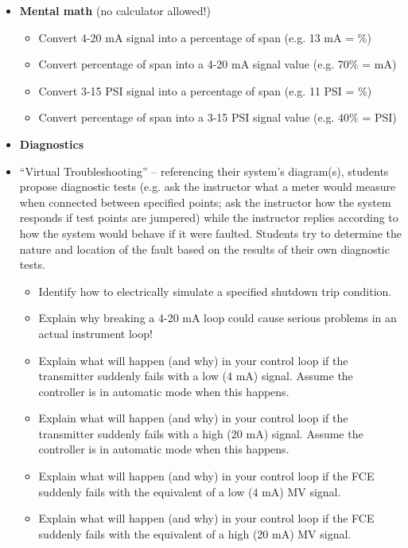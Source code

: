 \documentclass[12pt,a4paper]{article}
\begin{document}
\filbreak

\begin{itemize}
\item{} {\bf Mental math} (no calculator allowed!)
\begin{itemize}

\item{} Convert 4-20 mA signal into a percentage of span (e.g. 13 mA = \underbar{\hskip 20pt}\%)
\item{} Convert percentage of span into a 4-20 mA signal value (e.g. 70\% = \underbar{\hskip 20pt} mA)
\item{} Convert 3-15 PSI signal into a percentage of span (e.g. 11 PSI = \underbar{\hskip 20pt}\%)
\item{} Convert percentage of span into a 3-15 PSI signal value (e.g. 40\% = \underbar{\hskip 20pt} PSI)
\end{itemize}
\end{itemize}

\filbreak

\begin{itemize}
\item{} {\bf Diagnostics}
\item{} ``Virtual Troubleshooting'' -- referencing their system's diagram(s), students propose diagnostic tests (e.g. ask the instructor what a meter would measure when connected between specified points; ask the instructor how the system responds if test points are jumpered) while the instructor replies according to how the system would behave if it were faulted.  Students try to determine the nature and location of the fault based on the results of their own diagnostic tests.
\begin{itemize}

\item{} Identify how to electrically simulate a specified shutdown trip condition.
\item{} Explain why breaking a 4-20 mA loop could cause serious problems in an actual instrument loop!
\item{} Explain what will happen (and why) in your control loop if the transmitter suddenly fails with a low (4 mA) signal.  Assume the controller is in automatic mode when this happens.
\item{} Explain what will happen (and why) in your control loop if the transmitter suddenly fails with a high (20 mA) signal.  Assume the controller is in automatic mode when this happens.
\item{} Explain what will happen (and why) in your control loop if the FCE suddenly fails with the equivalent of a low (4 mA) MV signal.
\item{} Explain what will happen (and why) in your control loop if the FCE suddenly fails with the equivalent of a high (20 mA) MV signal.
\end{itemize}
\end{itemize}
\end{document}
